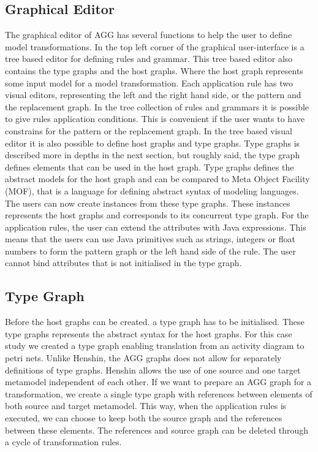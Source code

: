 \documentclass[pdftex,11pt,a4paper]{article}
\begin{document}
\subsection{Graphical Editor}
The graphical editor of AGG has several functions to help the user to define
model transformations. In the top left corner of the graphical user-interface is
a tree based editor for defining rules and grammar. This tree based editor also
contains the type graphs and the host graphs. Where the host graph represents
some input model for a model transformation.
\indent Each application rule has two visual editors, representing the left and
the right hand side, or the pattern and the replacement graph. In the tree
collection of rules and grammars it is possible to give rules application
conditions. This is convenient if the user wants to have constrains for the
pattern or the replacement graph. 
\indent In the tree based visual editor it is also possible to define host
graphs and type graphs. Type graphs is described more in depths in the next
section, but roughly said, the type graph defines elements that can be used in
the host graph. Type graphs defines the abstract models for the host graph and
can be compared to Meta Object Facility
(MOF)\cite{OMGAdoptedSpecificationptc/03-10-04}, that is a language for defining
abstract syntax of modeling languages. The users can now create instances
from these type graphs. These instances represents the host graphs and
corresponds to its concurrent type graph. 
\indent For the application rules, the user can extend the attributes with Java
expressions. This means that the users can use Java primitives such as strings,
integers or float numbers to form the pattern graph or the left hand side of the
rule. The user cannot bind attributes that is not initialised in the type graph. 

\subsection{Type Graph}

Before the host graphs can be created. a type graph has to be initialised. These
type graphs represents the abstract syntax for the host graphs. For this
case study we created a type graph enabling translation from an activity diagram
to petri nets. Unlike Henshin, the AGG graphs does not allow for separately
definitions of type graphs. Henshin allows the use of one source and one target
metamodel independent of each other. If we want to prepare an AGG graph for a
transformation, we create a single type graph with references between elements
of both source and target metamodel. This way, when the application rules is
executed, we can choose to keep both the source graph and the references between
these elements. The references and source graph can be deleted through a cycle
of transformation rules.
\end{document}
